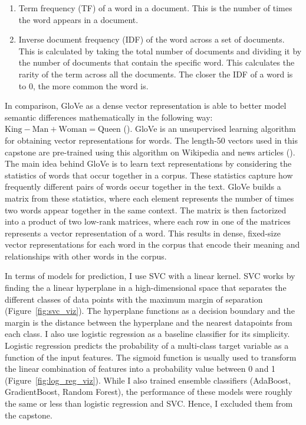 \begin{enumerate}
	\item Term frequency (TF) of a word in a document. This is the number of times the word appears in a document.
	\item Inverse document frequency (IDF) of the word across a set of documents. This is calculated by taking the total number of documents and dividing it by the number of documents that contain the specific word. This calculates the rarity of the term across all the documents. The closer the IDF of a word is to 0, the more common the word is.
\end{enumerate}

In comparison, GloVe as a dense vector representation is able to better model semantic differences mathematically in the following way: $\text{King} - \text{Man} + \text{Woman} = \text{Queen}$ (\cite{vector_differences_2015}). GloVe is an unsupervised learning algorithm for obtaining vector representations for words. The length-50 vectors used in this capstone are pre-trained using this algorithm on Wikipedia and news articles (\cite{pennington2014glove}). The main idea behind GloVe is to learn text representations by considering the statistics of words that occur together in a corpus. These statistics capture how frequently different pairs of words occur together in the text. GloVe builds a matrix from these statistics, where each element represents the number of times two words appear together in the same context. The matrix is then factorized into a product of two low-rank matrices, where each row in one of the matrices represents a vector representation of a word. This results in dense, fixed-size vector representations for each word in the corpus that encode their meaning and relationships with other words in the corpus.

In terms of models for prediction, I use SVC with a linear kernel. SVC works by finding the a linear hyperplane in a high-dimensional space that separates the different classes of data points with the maximum margin of separation (Figure~\ref{fig:svc_viz}). The hyperplane functions as a decision boundary and the margin is the distance between the hyperplane and the nearest datapoints from each class. I also use logistic regression as a baseline classifier for its simplicity. Logistic regression predicts the probability of a multi-class target variable as a function of the input features. The sigmoid function is usually used to transform the linear combination of features into a probability value between 0 and 1 (Figure~\ref{fig:log_reg_viz}). While I also trained ensemble classifiers (AdaBoost, GradientBoost, Random Forest), the performance of these models were roughly the same or less than logistic regression and SVC. Hence, I excluded them from the capstone.



